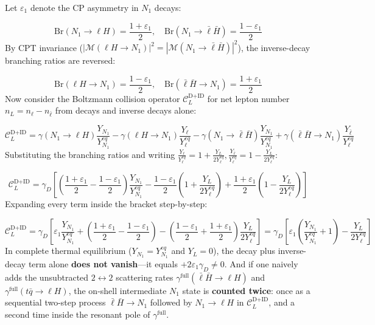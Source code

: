 \documentclass[aps,prd,onecolumn,superscriptaddress,nofootinbib,longbibliography,10pt]{revtex4-2}
\begin{document}
{{  Let \(\varepsilon_1\) denote the CP asymmetry in \(N_1\) decays:


  \[ \text{Br}(N_1 \to \ell H) = \frac{1 + \varepsilon_1}{2}, \quad \text{Br}(N_1 \to \bar{\ell}\bar{H}) = \frac{1 - \varepsilon_1}{2} \]
  By CPT invariance (\(|\mathcal{M}(\ell H \to N_1)|^2 = |\mathcal{M}(N_1 \to \bar{\ell}\bar{H})|^2\)), the inverse-decay branching ratios are reversed:


  \[ \text{Br}(\ell H \to N_1) = \frac{1 - \varepsilon_1}{2}, \quad \text{Br}(\bar{\ell}\bar{H} \to N_1) = \frac{1 + \varepsilon_1}{2} \]
  Now consider the Boltzmann collision operator \(\mathcal{C}_L^{\text{D+ID}}\) for net lepton number \(n_L = n_\ell - n_{\bar{\ell}}\) from decays and inverse decays alone:


  \[ \mathcal{C}_L^{\text{D+ID}} = \gamma(N_1 \to \ell H)\frac{Y_{N_1}}{Y_{N_1}^{eq}} - \gamma(\ell H \to N_1)\frac{Y_\ell}{Y_\ell^{eq}} - \gamma(N_1 \to \bar{\ell}\bar{H})\frac{Y_{N_1}}{Y_{N_1}^{eq}} + \gamma(\bar{\ell}\bar{H} \to N_1)\frac{Y_{\bar{\ell}}}{Y_\ell^{eq}} \]
  Substituting the branching ratios and writing \(\frac{Y_\ell}{Y_\ell^{eq}} = 1 + \frac{Y_L}{2Y_\ell^{eq}}, \frac{Y_{\bar{\ell}}}{Y_\ell^{eq}} = 1 - \frac{Y_L}{2Y_\ell^{eq}}\):


  \[ \mathcal{C}_L^{\text{D+ID}} = \gamma_D\left[ \left(\frac{1 + \varepsilon_1}{2} - \frac{1 - \varepsilon_1}{2}\right)\frac{Y_{N_1}}{Y_{N_1}^{eq}} - \frac{1 - \varepsilon_1}{2}\left(1 + \frac{Y_L}{2Y_\ell^{eq}}\right) + \frac{1 + \varepsilon_1}{2}\left(1 - \frac{Y_L}{2Y_\ell^{eq}}\right) \right] \]
  Expanding every term inside the bracket step-by-step:


  \[ \mathcal{C}_L^{\text{D+ID}} = \gamma_D\left[ \varepsilon_1\frac{Y_{N_1}}{Y_{N_1}^{eq}} + \left(\frac{1 + \varepsilon_1}{2} - \frac{1 - \varepsilon_1}{2}\right) - \left(\frac{1 - \varepsilon_1}{2} + \frac{1 + \varepsilon_1}{2}\right)\frac{Y_L}{2Y_\ell^{eq}} \right] = \gamma_D\left[ \varepsilon_1\left(\frac{Y_{N_1}}{Y_{N_1}^{eq}} + 1\right) - \frac{Y_L}{2Y_\ell^{eq}} \right] \]
  In complete thermal equilibrium (\(Y_{N_1} = Y_{N_1}^{eq}\) and \(Y_L = 0\)), the decay plus inverse-decay term alone \textbf{does not vanish}—it equals \(+2\varepsilon_1\gamma_D \neq 0\). And if one naively adds the unsubtracted \(2 \leftrightarrow 2\) scattering rates \(\gamma^{\text{full}}(\bar{\ell}\bar{H} \to \ell H)\) and \(\gamma^{\text{full}}(t\bar{q} \to \ell H)\), the on-shell intermediate \(N_1\) state is \textbf{counted twice}: once as a sequential two-step process \(\bar{\ell}\bar{H} \to N_1\) followed by \(N_1 \to \ell H\) in \(\mathcal{C}_L^{\text{D+ID}}\), and a second time inside the resonant pole of \(\gamma^{\text{full}}\).



}}
\end{document}
